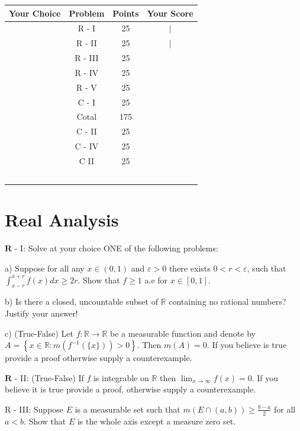 \documentclass[10pt]{article}
\begin{document}
\begin{tabular}{|l|c|c|c|}
\hline
Your Choice & Problem & Points & Your Score \\
\hline
 & R - I & 25 & $\mid$ \\
\hline
 & R - II & 25 & $\mid$ \\
\hline
 & R - III & 25 &  \\
\hline
 & R - IV & 25 &  \\
\hline
 & R - V & 25 &  \\
\hline
 & C - I & 25 &  \\
\hline
 & Cotal & 175 &  \\
\hline
 & C - II & 25 &  \\
\hline
 & C - IV & 25 &  \\
\hline
 & C II & 25 &  \\
\hline
 &  &  &  \\
\hline
 &  &  &  \\
\hline
 &  &  &  \\
\hline
 &  &  &  \\
\hline
 &  &  &  \\
\hline
\end{tabular}

\section{Real Analysis}
$\mathbf{R}$ - I: Solve at your choice ONE of the following problems:

a) Suppose for all any $x \in(0,1)$ and $\varepsilon>0$ there exists $0<r<\varepsilon$, such that $\int_{x-r}^{x+r} f(x) d x \geq 2 r$. Show that $f \geq 1$ a.e for $x \in[0,1]$.

b) Is there a closed, uncountable subset of $\mathbb{R}$ containing no rational numbers? Justify your answer!

c) (True-False) Let $f: \mathbb{R} \rightarrow \mathbb{R}$ be a measurable function and denote by $A=\left\{x \in \mathbb{R}: m\left(f^{-1}(\{x\})\right)>0\right\}$. Then $m(A)=0$. If you believe is true provide a proof otherwise supply a counterexample.

$\mathbf{R}$ - II: (True-False) If $f$ is integrable on $\mathbb{R}$ then $\lim _{x \rightarrow \infty} f(x)=0$. If you believe it is true provide a proof, otherwise supply a counterexample.

R - III: Suppose $E$ is a measurable set such that $m(E \cap(a, b)) \geq \frac{b-a}{2}$ for all $a<b$. Show that $E$ is the whole axis except a measure zero set.
\end{document}
